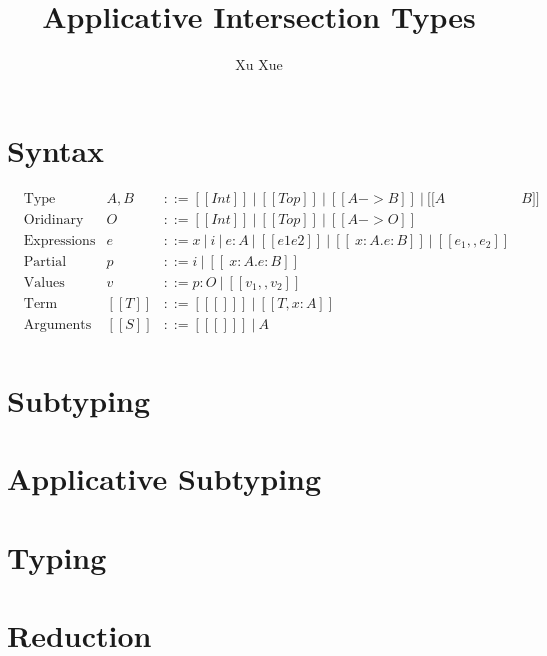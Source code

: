 \documentclass[a4paper]{article}
\title{Applicative Intersection Types}
\author{Xu Xue}
\begin{document}
\maketitle

\section{Syntax}

\begin{align*}
  &\text{Type} &A, B&::= [[Int]] ~|~ [[Top]] ~|~ [[A-> B]] ~|~ [[ A & B ]]\\
  &\text{Oridinary Type} &O&::= [[Int]] ~|~ [[Top]] ~|~ [[A-> O]]\\
  &\text{Expressions} &e    &::= x ~|~ i ~|~ e:A ~|~ [[e1 e2]] ~|~ [[ \ x : A .e : B]]~|~ [[e_1,,e_2]] \\
  &\text{Partial Values} &p   &::= i~|~ [[ \ x : A .e : B]] \\
  &\text{Values} &v   &::= p:O ~|~ [[v_1,,v_2]]\\
  &\text{Term contexts} &[[T]] &::=  [[ [] ]] ~|~ [[ T, x:A ]] \\
  &\text{Arguments} &[[S]] &::= [[ [] ]] ~|~ A \\
\end{align*}

\section{Subtyping}

\ottdefnsOrdinaryType

\ottdefnsSplitType

\section{Applicative Subtyping}

\ottdefnsUnifiedSubtyping

\section{Typing}

\ottdefnsTyping

\section{Reduction}

\ottdefnsCasting

\ottdefnsParallelApplication

\ottdefnsReduction


\end{document}

